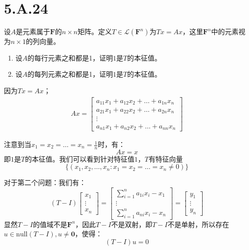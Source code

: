 \documentclass[10pt,a4paper,UTF8]{article}
\begin{document}
\section{5.A.24}
\label{sec:orgd5da89d}


\begin{problem}
设\(A\)是元素属于\(\mathbf{F}\)的\(n\times n\)矩阵。定义\(T\in \mathcal{L}(\mathbf{F}^{n})\)为\(Tx = Ax\)，这里\(\mathbf{F}^{n}\)中的元素视为\(n\times 1\)的列向量。
\begin{enumerate}
\item 设\(A\)的每行元素之和都是1，证明\(1\)是\(T\)的本征值。
\item 设\(A\)的每列元素之和都是1，证明\(1\)是\(T\)的本征值。
\end{enumerate}
\end{problem}

\begin{answer}
因为\(Tx = Ax\)；
\begin{eqnarray}
\label{eq:18}
Ax =
\begin{bmatrix}
a_{11}x_{1} + a_{12}x_{2} + \ldots + a_{1n}x_{n} \\
a_{21}x_{1} + a_{22}x_{2} + \ldots + a_{2n}x_{n} \\
\vdots \\
a_{n1}x_{1} + a_{n2}x_{2} + \ldots + a_{nn}x_{n}
\end{bmatrix}
\end{eqnarray}

注意到当\(x_{1}=x_{2}=\ldots =x_{n}=\frac{1}{n}\)时，有：
\begin{equation}
\label{eq:19}
Ax = x
\end{equation}
即\(1\)是\(T\)的本征值。我们可以看到针对特征值\(1\)，\(T\)有特征向量\[\{(x_{1},x_{2},\ldots ,x_{n}: x_{1} = x_{2} = \ldots = x_{n} \neq 0)\}\]
\end{answer}
\begin{answer}
对于第二个问题：我们有：
\begin{equation}
\label{eq:20}
(T-I)
\begin{bmatrix}
x_{1} \\  \vdots \\ x_{n}
\end{bmatrix}
=
\begin{bmatrix}
\sum_{i=1}^{n}a_{1i}x_{i} - x_{1} \\
\vdots \\
\sum_{i=1}^{n}a_{ni}x_{i} - x_{n}
\end{bmatrix}
=
\begin{bmatrix}
y_{1} \\
\vdots \\
y_{n}
\end{bmatrix}
\end{equation}
显然\(T-I\)的值域不是\(\mathbf{F}^{n}\)，因此\(T-I\)不是双射，即\(T-I\)不是单射，所以存在\(u\in \mathrm{null}(T-I),u\neq \mathbf{0}\)，使得：\[(T-I)u = 0\]
\end{answer}
\end{document}
